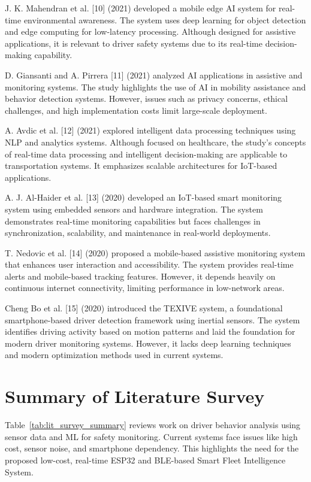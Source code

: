 J. K. Mahendran et al. [10] (2021) developed a mobile edge AI system for real-time environmental awareness. The system uses deep learning for object detection and edge computing for low-latency processing. Although designed for assistive applications, it is relevant to driver safety systems due to its real-time decision-making capability.

D. Giansanti and A. Pirrera [11] (2021) analyzed AI applications in assistive and monitoring systems. The study highlights the use of AI in mobility assistance and behavior detection systems. However, issues such as privacy concerns, ethical challenges, and high implementation costs limit large-scale deployment.

A. Avdic et al. [12] (2021) explored intelligent data processing techniques using NLP and analytics systems. Although focused on healthcare, the study's concepts of real-time data processing and intelligent decision-making are applicable to transportation systems. It emphasizes scalable architectures for IoT-based applications.

A. J. Al-Haider et al. [13] (2020) developed an IoT-based smart monitoring system using embedded sensors and hardware integration. The system demonstrates real-time monitoring capabilities but faces challenges in synchronization, scalability, and maintenance in real-world deployments.

T. Nedovic et al. [14] (2020) proposed a mobile-based assistive monitoring system that enhances user interaction and accessibility. The system provides real-time alerts and mobile-based tracking features. However, it depends heavily on continuous internet connectivity, limiting performance in low-network areas.

Cheng Bo et al. [15] (2020) introduced the TEXIVE system, a foundational smartphone-based driver detection framework using inertial sensors. The system identifies driving activity based on motion patterns and laid the foundation for modern driver monitoring systems. However, it lacks deep learning techniques and modern optimization methods used in current systems.

\section{Summary of Literature Survey}
\label{sec:lit_summary}
Table~\ref{tab:lit_survey_summary} reviews work on driver behavior analysis using sensor data and ML for safety monitoring. Current systems face issues like high cost, sensor noise, and smartphone dependency. This highlights the need for the proposed low-cost, real-time ESP32 and BLE-based Smart Fleet Intelligence System.


